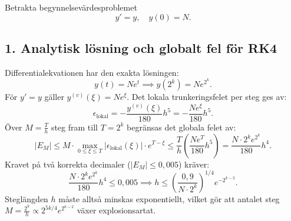 \documentclass{article}
\begin{document}
Betrakta begynnelsevärdesproblemet
\begin{equation}
    y' = y, \quad y(0) = N.
\end{equation}

\subsection*{1. Analytisk lösning och globalt fel för RK4}
Differentialekvationen har den exakta lösningen:
\begin{equation}
    y(t) = N e^t \implies y(2^k) = N e^{2^k}.
\end{equation}
För $y' = y$ gäller $y^{(v)}(\xi) = N e^\xi$. Det lokala trunkeringsfelet per steg ges av:
\begin{equation}
    \epsilon_{\text{lokal}} = -\frac{y^{(v)}(\xi)}{180} h^5 = -\frac{N e^\xi}{180} h^5.
\end{equation}
Över $M = \frac{T}{h}$ steg fram till $T = 2^k$ begränsas det globala felet av:
\begin{equation}
    |E_M| \le M \cdot \max_{0 \le \xi \le T} |\epsilon_{\text{lokal}}(\xi)| \cdot e^{T - \xi} \le \frac{T}{h} \left(\frac{N e^T}{180} h^5\right) = \frac{N \cdot 2^k e^{2^k}}{180} h^4.
\end{equation}
Kravet på två korrekta decimaler ($|E_M| \le 0{,}005$) kräver:
\begin{equation}
    \frac{N \cdot 2^k e^{2^k}}{180} h^4 \le 0{,}005 \implies h \le \left(\frac{0{,}9}{N \cdot 2^k}\right)^{1/4} e^{-2^{k-2}}.
\end{equation}
Steglängden $h$ måste alltså minskas exponentiellt, vilket gör att antalet steg $M = \frac{2^k}{h} \propto 2^{5k/4} e^{2^{k-2}}$ växer explosionsartat.
\end{document}
